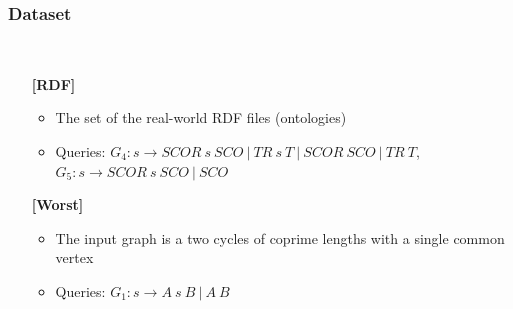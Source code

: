 \documentclass[xcolor=table]{beamer}
\begin{document}
\begin{frame}[fragile] \frametitle{Dataset}
  \begin{minipage}[t]{1cm}
\hspace{1cm}
  \end{minipage}
  ~
\begin{minipage}[t]{0.85\textwidth}
\begin{itemize}
\item[\textbf{[RDF]}]
\begin{itemize}
  \item The set of the real-world RDF files (ontologies)
  \item Queries: $G_4: s \to SCOR \ s \ SCO \ | \ TR \ s \ T \ | \ SCOR \ SCO \ | \ TR \ T$,
$G_5: s \to SCOR \ s \ SCO \ | \ SCO$
\end{itemize}

\pause
\item[\textbf{[Worst]}]
\begin{itemize}
  \item The input graph is a two cycles of coprime lengths with a single common vertex
  \begin{figure}
\end{figure}
  \item Queries: $G_1: s \to A \ s \ B \ | \ A \ B$
\end{itemize}
\end{itemize}
\end{minipage}
\end{frame}
\end{document}
